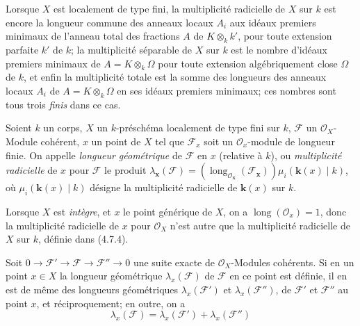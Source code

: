 Lorsque $X$ est localement de type fini, la multiplicité radicielle de $X$ sur
$k$ est encore la longueur commune des anneaux locaux $A_i$ aux idéaux
premiers minimaux de l'anneau total des fractions $A$ de $K\otimes_k k'$,
pour toute extension parfaite $k'$ de $k$; la multiplicité séparable de $X$
sur $k$ est le nombre d'idéaux premiers minimaux de $A=K\otimes_k\Omega$ pour
toute extension algébriquement close $\Omega$ de $k$, et enfin la multiplicité
totale est la somme des longueurs des anneaux locaux $A_i$ de
$A=K\otimes_k\Omega$ en ses idéaux premiers minimaux; ces nombres sont tous
trois \emph{finis} dans ce cas.

\begin{definition}[4.7.5]
\label{IV.2.4.7.5-fr}
Soient $k$ un corps, $X$ un $k$-préschéma localement de type fini sur $k$,
$\mathscr F$ un $\mathcal O_X$-Module cohérent, $x$ un point de $X$ tel que
$\mathscr F_x$ soit un $\mathcal O_x$-module de longueur finie. On appelle
\emph{longueur géométrique} de $\mathscr F$ en $x$ (relative à $k$), ou
\emph{multiplicité radicielle} de $x$ pour $\mathscr F$ le produit
$\lambda_{\boldsymbol{x}}(\mathscr F)
=(\operatorname{long}_{\mathcal O_{\boldsymbol{x}}}(\mathscr F_{\boldsymbol{x}}))\mu_i(\boldsymbol{k}(x)\mid k)$,
où $\mu_i(\boldsymbol{k}(x)\mid k)$ désigne la multiplicité radicielle de $\boldsymbol{k}(x)$ sur $k$.
\end{definition}

Lorsque $X$ est \emph{intègre}, et $x$ le point générique de $X$, on a
$\operatorname{long}(\mathcal O_x)=1$, donc la multiplicité radicielle de $x$
pour $\mathcal O_X$ n'est autre que la multiplicité radicielle de $X$ sur $k$,
définie dans (4.7.4).


\begin{proposition}[4.7.6]
\label{IV.2.4.7.6-fr}
Soit
$0\boldsymbol{\longrightarrow}\mathscr F'\longrightarrow\mathscr F
\longrightarrow\mathscr F''\longrightarrow0$
une suite exacte de $\mathcal O_X$-Modules cohérents. Si en un point $x\in X$
la longueur géométrique $\lambda_x(\mathscr F)$ de $\mathscr F$ en ce point
est définie, il en est de même des longueurs géométriques
$\lambda_x(\mathscr F')$ et $\lambda_x(\mathscr F'')$, de $\mathscr F'$ et
$\mathscr F''$ au point $x$, et réciproquement; en outre, on a
\begin{equation}
\lambda_x(\mathscr F)=\lambda_x(\mathscr F')+\lambda_x(\mathscr F'')
\tag{4.7.6.1}
\label{IV.2.4.7.6.1-fr}
\end{equation}
\end{proposition}

